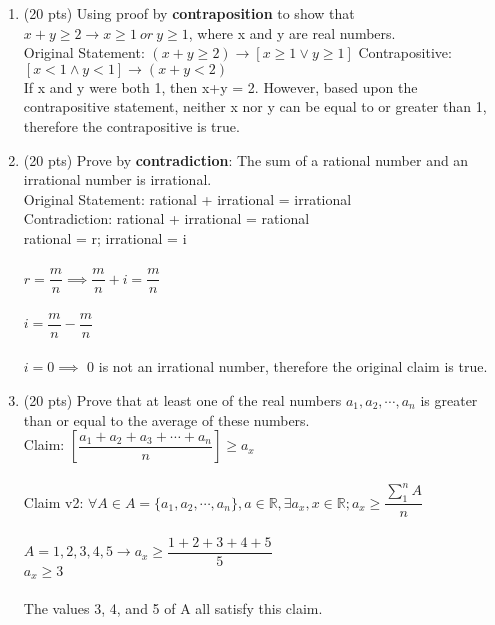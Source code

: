 \documentclass[11pt]{article}
\def\R{\mathbb{ R}}
\begin{document}
\begin{enumerate}
  \item (20 pts) Using proof by \textbf{contraposition} to show that $x+y\geq 2 \rightarrow x\geq 1~or~y\geq 1$, where x and y are real numbers. \\
    Original Statement: $(x+y\geq 2) \rightarrow [x\geq 1 \vee y\geq 1]$
    Contrapositive: $[x<1 \wedge y<1] \rightarrow (x+y<2)$ \\
    If x and y were both 1, then x+y = 2. However, based upon the contrapositive statement, neither x nor y can be equal to or greater than 1, therefore the contrapositive is true.

  \item (20 pts) Prove by \textbf{contradiction}: The sum of a rational number and an irrational number is irrational. \\
    Original Statement: rational + irrational = irrational \\
    Contradiction: rational + irrational = rational \\
    rational = r; irrational = i \\\\
    $r=\dfrac{m}{n} \implies \dfrac{m}{n} + i = \dfrac{m}{n}$ \\\\
    $i=\dfrac{m}{n}-\dfrac{m}{n}$ \\\\
    $i=0 \implies$ 0 is not an irrational number, therefore the original claim is true. \\
    
  \item (20 pts) Prove that at least one of the real numbers $a_1,a_2,\cdots,a_n$ is greater than or equal to the average of these numbers. \\
    Claim: $[\dfrac{a_1+ a_2+ a_3+ \cdots + a_n}{n}] \geq a_x$ \\ \\
    Claim v2: $\forall A \in A=\{a_1, a_2, \cdots, a_n\}, a \in \R, \exists a_x, x \in \R; a_x \geq  \dfrac{\sum_{1}^{n}A}{n} $ \\ \\
    $A = {1, 2, 3, 4, 5} \rightarrow a_x \geq \dfrac{1+2+3+4+5}{5}$ \\
    $a_x \geq 3$ \\\\
    The values 3, 4, and 5 of A all satisfy this claim.

\end{enumerate}
\end{document}
